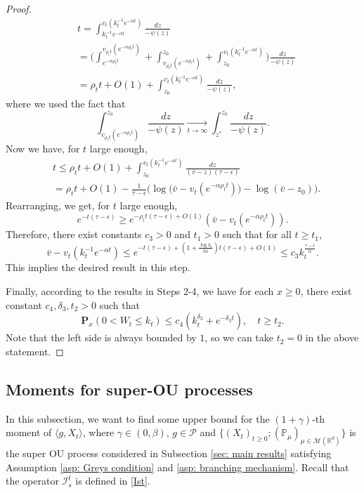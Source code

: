 \documentclass[12pt,a4paper]{amsart}
\theoremstyle{plain}
\theoremstyle{definition}
\numberwithin{equation}{section}
\begin{document}
\begin{proof}
\begin{align}
    &t =\int^{v_t(k_t^{-1} e^{-\alpha t})}_{k_t^{-1} e^{-\alpha t}}\frac{dz}{-\psi(z)}
    \\&= \Big(\int^{v_{\rho_t t}(e^{-\alpha \rho_t t})}_{e^{-\alpha \rho_t t}}  + \int^{z_0}_{v_{\rho_t t}(e^{-\alpha \rho_t t})} +\int^{v_t(k_t^{-1}e^{-\alpha  t})}_{z_0}\Big)\frac{dz}{-\psi(z)}
     \\&= \rho_t t + O(1) +\int^{v_t(k_t^{-1}e^{-\alpha t})}_{z_0} \frac{dz}{-\psi(z)},
\end{align}
    where we used the fact that
\[
    \int_{v_{\rho_t t}(e^{-\alpha \rho_tt})}^{z_0} \frac{dz}{-\psi(z)} \xrightarrow[t\to \infty] {}\int_{z^*}^{z_0} \frac{dz}{-\psi(z)}.
\]
    Now we have, for $t$ large enough,
\begin{align}
    &t\leq  \rho_t t + O(1)+ \int_{z_0}^{v_t(k_t^{-1}e^{-\alpha t})} \frac{dz}{(\bar v-z)(\tau - \epsilon)}
    \\&=  \rho_t t +O(1)- \frac{1}{\tau-\epsilon}\Big( \log \big(\bar v-v_t(e^{-\alpha \rho_t t})\big) - \log(\bar v-z_0)\Big).
\end{align}
    Rearranging, we get, for $t$ large enough,
\[
    e^{-t(\tau - \epsilon)} \geq e^{-\rho_t t(\tau - \epsilon)+O(1)}(\bar v - v_t(e^{-\alpha \rho_t t})).
\]
    Therefore, there exist
    constants $c_3>0$ and $t_1>0$ such that for all $t\geq t_1$,
\[
    \bar v - v_t(k_t^{-1} e^{-\alpha t}) \leq e^{-t(\tau -\epsilon)+ (1+\frac{\log k_t}{t\alpha})t(\tau - \epsilon)+O(1)}
   \leq c_3k_t^{\frac{\tau - \epsilon}{\alpha}}.
\]
    This implies the desired result in this step.

    Finally, according to the results in Steps 2-4, we have for each $x\geq 0$, there exist
    constant $c_4, \delta_3, t_2 > 0$ such that
\[
    \mathbf P_{x}(0< W_t\leq k_t) \leq
    c_4(k_t^{\delta_3}+e^{-\delta_3 t}),\quad t\geq t_2.
\]
Note that the left side is always bounded by $1$, so we can take $t_2 =0$ in the above statement.
\end{proof}

\subsection{Moments for super-OU processes}
\label{sec: Moments for super-OU processes}
    In this subsection,  we want to find some upper bound for the $(1+\gamma)$-th moment of $\langle g ,X_t \rangle$, 
    where $\gamma \in (0,\beta)$, $g\in \mathcal P$ and $\{(X_t)_{t\geq 0}; (\mathbb P_\mu)_{\mu \in \mathcal M(\mathbb R^d)}\}$ is the super OU process considered in Subsection \ref{sec: main results} satisfying Assumption \ref{asp: Greys condition} and \ref{asp: branching mechanism}.
    Recall that the operator $\mathcal{I}^t_s$ is defined in \ref{Ist}.
\end{document}
